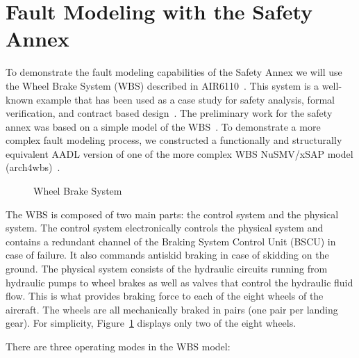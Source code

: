 \section{Fault Modeling with the Safety Annex}
\label{sec:fault_modeling}

To demonstrate the fault modeling capabilities of the Safety Annex we will use the Wheel Brake System (WBS) described in AIR6110~\cite{AIR6110}.  This system is a well-known example that has been used as a case study for safety analysis, formal verification, and contract based design~\cite{DBLP:conf/cav/BozzanoCPJKPRT15, 10.1007/978-3-319-11936-6-7, CAV2015:BoCiGrMa, Joshi05:SafeComp}. The preliminary work for the safety annex was based on a simple model of the WBS~\cite{Stewart17:IMBSA}. To demonstrate a more complex fault modeling process, we constructed a functionally and structurally equivalent AADL version of one of the more complex WBS NuSMV/xSAP model (arch4wbs)~\cite{DBLP:conf/cav/BozzanoCPJKPRT15}.    

\begin{figure}[h!]
	\centering
	\caption{Wheel Brake System}
	\label{fig:wbs}
\end{figure} 

The WBS is composed of two main parts: the control system and the physical system. The control system electronically controls the physical system and contains a redundant channel of the Braking System Control Unit (BSCU) in case of failure. It also commands antiskid braking in case of skidding on the ground. The physical system consists of the hydraulic circuits running from hydraulic pumps to wheel brakes as well as valves that control the hydraulic fluid flow. This is what provides braking force to each of the eight wheels of the aircraft. The wheels are all mechanically braked in pairs (one pair per landing gear). For simplicity, Figure~\ref{fig:wbs} displays only two of the eight wheels. 

There are three operating modes in the WBS model:

